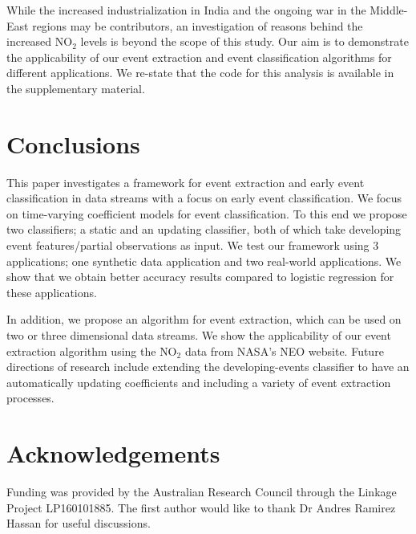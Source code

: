\documentclass[11pt]{article}
\begin{document}
	While the increased industrialization in India and the ongoing war in the Middle-East regions may be contributors, an investigation of reasons behind the increased $\text{NO}_2$ levels is beyond the scope of this study. Our aim is to demonstrate the applicability of our event extraction and event classification algorithms for different applications. We re-state that the code for this analysis is available in the supplementary material.
		
	\section{Conclusions}\label{sec:Conclusions}
	
	This paper investigates a framework for event extraction and early event classification in data streams with a focus on early event classification. We focus on time-varying coefficient models for event classification.  To this end we propose two classifiers; a static and an updating classifier, both of which take developing event features/partial observations as input. We test our framework using 3 applications; one synthetic data application and two real-world applications. We show that we obtain better accuracy results compared to logistic regression for these applications. 
	
	In addition, we propose an algorithm for event extraction, which can be used on two or three dimensional data streams. We show the applicability of our event extraction algorithm using the $\text{NO}_2$ data from NASA's NEO website.    
	Future directions of research include extending the developing-events classifier to have an automatically updating coefficients and including a variety of  event extraction processes.      
	
	\section*{Acknowledgements}
	Funding was provided by the Australian Research Council through the Linkage Project LP160101885. The first author would like to thank Dr Andres Ramirez Hassan for useful discussions.
	
	\footnotesize
	
	
	
\end{document}
